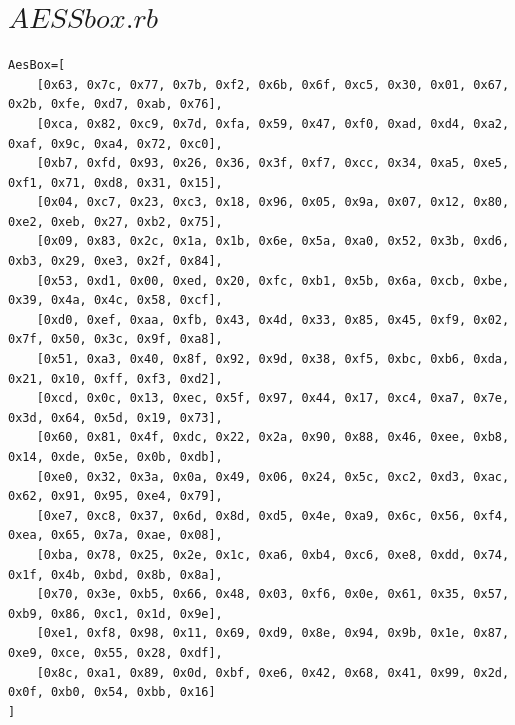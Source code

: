 \documentclass[10pt,a4paper]{article}
\begin{document}
\section{$AESSbox.rb$}
\begin{verbatim}
AesBox=[
    [0x63, 0x7c, 0x77, 0x7b, 0xf2, 0x6b, 0x6f, 0xc5, 0x30, 0x01, 0x67, 0x2b, 0xfe, 0xd7, 0xab, 0x76], 
    [0xca, 0x82, 0xc9, 0x7d, 0xfa, 0x59, 0x47, 0xf0, 0xad, 0xd4, 0xa2, 0xaf, 0x9c, 0xa4, 0x72, 0xc0], 
    [0xb7, 0xfd, 0x93, 0x26, 0x36, 0x3f, 0xf7, 0xcc, 0x34, 0xa5, 0xe5, 0xf1, 0x71, 0xd8, 0x31, 0x15],
    [0x04, 0xc7, 0x23, 0xc3, 0x18, 0x96, 0x05, 0x9a, 0x07, 0x12, 0x80, 0xe2, 0xeb, 0x27, 0xb2, 0x75], 
    [0x09, 0x83, 0x2c, 0x1a, 0x1b, 0x6e, 0x5a, 0xa0, 0x52, 0x3b, 0xd6, 0xb3, 0x29, 0xe3, 0x2f, 0x84], 
    [0x53, 0xd1, 0x00, 0xed, 0x20, 0xfc, 0xb1, 0x5b, 0x6a, 0xcb, 0xbe, 0x39, 0x4a, 0x4c, 0x58, 0xcf],
    [0xd0, 0xef, 0xaa, 0xfb, 0x43, 0x4d, 0x33, 0x85, 0x45, 0xf9, 0x02, 0x7f, 0x50, 0x3c, 0x9f, 0xa8],
    [0x51, 0xa3, 0x40, 0x8f, 0x92, 0x9d, 0x38, 0xf5, 0xbc, 0xb6, 0xda, 0x21, 0x10, 0xff, 0xf3, 0xd2],
    [0xcd, 0x0c, 0x13, 0xec, 0x5f, 0x97, 0x44, 0x17, 0xc4, 0xa7, 0x7e, 0x3d, 0x64, 0x5d, 0x19, 0x73],
    [0x60, 0x81, 0x4f, 0xdc, 0x22, 0x2a, 0x90, 0x88, 0x46, 0xee, 0xb8, 0x14, 0xde, 0x5e, 0x0b, 0xdb], 
    [0xe0, 0x32, 0x3a, 0x0a, 0x49, 0x06, 0x24, 0x5c, 0xc2, 0xd3, 0xac, 0x62, 0x91, 0x95, 0xe4, 0x79], 
    [0xe7, 0xc8, 0x37, 0x6d, 0x8d, 0xd5, 0x4e, 0xa9, 0x6c, 0x56, 0xf4, 0xea, 0x65, 0x7a, 0xae, 0x08], 
    [0xba, 0x78, 0x25, 0x2e, 0x1c, 0xa6, 0xb4, 0xc6, 0xe8, 0xdd, 0x74, 0x1f, 0x4b, 0xbd, 0x8b, 0x8a], 
    [0x70, 0x3e, 0xb5, 0x66, 0x48, 0x03, 0xf6, 0x0e, 0x61, 0x35, 0x57, 0xb9, 0x86, 0xc1, 0x1d, 0x9e], 
    [0xe1, 0xf8, 0x98, 0x11, 0x69, 0xd9, 0x8e, 0x94, 0x9b, 0x1e, 0x87, 0xe9, 0xce, 0x55, 0x28, 0xdf],
    [0x8c, 0xa1, 0x89, 0x0d, 0xbf, 0xe6, 0x42, 0x68, 0x41, 0x99, 0x2d, 0x0f, 0xb0, 0x54, 0xbb, 0x16]
]
\end{verbatim}
\end{document}
